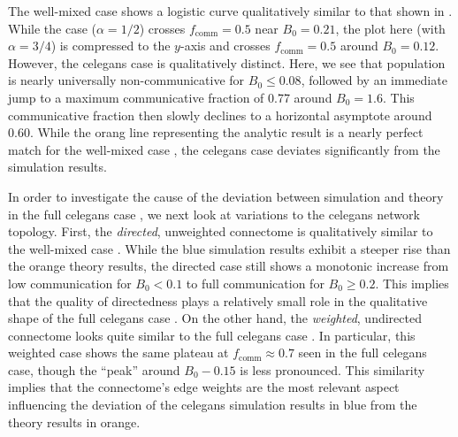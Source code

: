 \documentclass[pdflatex,lineno,referee,sn-mathphys-ay]{sn-jnl}
\begin{document}
The well-mixed case  shows a logistic curve
qualitatively similar to that shown in \citet{tripp2022evolutionary}.
While the \citet{tripp2022evolutionary} case ($\alpha = 1/2$)
crosses $f_{\text{comm}} = 0.5$ near $B_0 = 0.21$,
the plot here (with $\alpha = 3/4$) is compressed to the $y$-axis
and crosses $f_{\text{comm}} = 0.5$ around $B_0 = 0.12$.
However, the \gls{celegans} case 
is qualitatively distinct.
Here, we see that population is nearly universally non-communicative
for $B_0 \le 0.08$,
followed by an immediate jump to a maximum communicative fraction
of \num{0.77} around $B_0 = 1.6$.
This communicative fraction then slowly declines
to a horizontal asymptote around \num{0.60}.
While the orang line representing the analytic result
is a nearly perfect match for the well-mixed case ,
the \gls{celegans} case  deviates significantly
from the simulation results.

In order to investigate the cause of the deviation
between simulation and theory
in the full \gls{celegans} case ,
we next look at variations to the \gls{celegans} network topology.
First, the \emph{directed}, unweighted connectome
is qualitatively similar to the well-mixed case
.
While the blue simulation results exhibit a steeper rise
than the orange theory results,
the directed case still shows a monotonic increase
from low communication for $B_0 < 0.1$
to full communication for $B_0 \ge 0.2$.
This implies that the quality of directedness
plays a relatively small role in the qualitative shape
of the full \gls{celegans} case .
On the other hand,
the \emph{weighted}, undirected connectome
looks quite similar to the full \gls{celegans} case
.
In particular, this weighted case
shows the same plateau at $f_{\text{comm}} \approx 0.7$
seen in the full \gls{celegans} case,
though the ``peak'' around $B_0 - 0.15$ is less pronounced.
This similarity implies that the connectome's edge weights
are the most relevant aspect influencing the deviation
of the \gls{celegans} 
simulation results in blue from the theory results in orange.
\end{document}
